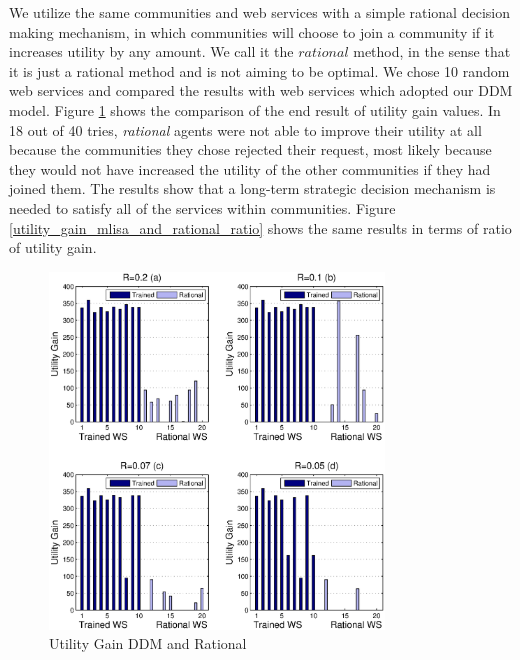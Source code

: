 \documentclass[10pt,journal,cspaper,compsoc]{IEEEtran}
\begin{document}
We utilize the same communities and web services with a simple rational decision making mechanism, in which communities will choose to join a community if it increases utility by any amount. We call it the $rational$ method, in the sense that it is just a rational method and is not aiming to be optimal. We chose 10 random web services and compared the results with web services which adopted our DDM model. Figure \ref{utility_gain_mlisa_and_rational} shows the comparison of the end result of utility gain values. In 18 out of 40 tries, \emph{rational} agents were not able to improve their utility at all because the communities they chose rejected their request, most likely because they would not have increased the utility of the other communities if they had joined them. The results show that a long-term strategic decision mechanism is needed to satisfy all of the services within communities. Figure \ref{utility_gain_mlisa_and_rational_ratio} shows the same results in terms of ratio of utility gain.

\begin{figure}%
\centering
\includegraphics[width=3.5in]{figures/utility_gain.eps}
\caption{Utility Gain DDM and Rational}
\label{utility_gain_mlisa_and_rational}
\end{figure}
\end{document}
